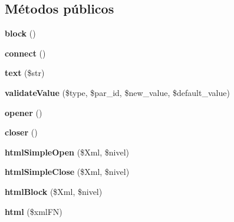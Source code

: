 \subsection*{\-Métodos públicos}
\begin{DoxyCompactItemize}
\item 
\hypertarget{classblock_a9b390283efee92f54e6eed6c281155ad}{{\bfseries block} ()}\label{classblock_a9b390283efee92f54e6eed6c281155ad}

\item 
\hypertarget{classblock_a975c7c9239a25602f4b457fdc430762f}{{\bfseries connect} ()}\label{classblock_a975c7c9239a25602f4b457fdc430762f}

\item 
\hypertarget{classblock_a079f285ef5aaeee792021a3850426879}{{\bfseries text} (\$str)}\label{classblock_a079f285ef5aaeee792021a3850426879}

\item 
\hypertarget{classblock_a0f1cfe5eb0f56e9c1b2a37c2ed64cf4b}{{\bfseries validate\-Value} (\$type, \$par\-\_\-id, \$new\-\_\-value, \$default\-\_\-value)}\label{classblock_a0f1cfe5eb0f56e9c1b2a37c2ed64cf4b}

\item 
\hypertarget{classblock_a3b3442844224e1bf4f576867bbf541e9}{{\bfseries opener} ()}\label{classblock_a3b3442844224e1bf4f576867bbf541e9}

\item 
\hypertarget{classblock_ae721cd25adbb868cb7184ccdd71c919a}{{\bfseries closer} ()}\label{classblock_ae721cd25adbb868cb7184ccdd71c919a}

\item 
\hypertarget{classblock_a40a4d88a8dd0bace93b171030a3f5379}{{\bfseries html\-Simple\-Open} (\$\-Xml, \$nivel)}\label{classblock_a40a4d88a8dd0bace93b171030a3f5379}

\item 
\hypertarget{classblock_ade8c7b59b5d23272ee5356cf804ed6fa}{{\bfseries html\-Simple\-Close} (\$\-Xml, \$nivel)}\label{classblock_ade8c7b59b5d23272ee5356cf804ed6fa}

\item 
\hypertarget{classblock_a4b7ba71e210f75b44e7f86d5948cb1af}{{\bfseries html\-Block} (\$\-Xml, \$nivel)}\label{classblock_a4b7ba71e210f75b44e7f86d5948cb1af}

\item 
\hypertarget{classblock_a97726852fcd6a5a1383fed3294abd491}{{\bfseries html} (\$xml\-F\-N)}\label{classblock_a97726852fcd6a5a1383fed3294abd491}


\end{DoxyCompactItemize}
